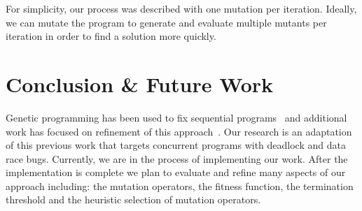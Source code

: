 \documentclass[10pt, conference, compsocconf]{IEEEtran}
\begin{document}
For simplicity, our process was described with one mutation per iteration. Ideally, we can mutate the program to generate and evaluate multiple mutants per iteration in order to find a solution more quickly.

\section{Conclusion \& Future Work}
\label{sec:conclusion_future_work}

Genetic programming has been used to fix sequential programs~\cite{FNWG09, AY08, Arc08, WNLF09, WFGN10} and additional work has focused on refinement of this approach~\cite{WT10}. Our research is an adaptation of this previous work that targets concurrent programs with deadlock and data race bugs. Currently, we are in the process of implementing our work.  After the implementation is complete we plan to evaluate and refine many aspects of our approach including: the mutation operators, the fitness function, the termination threshold and the heuristic selection of mutation operators.







%




\end{document}
